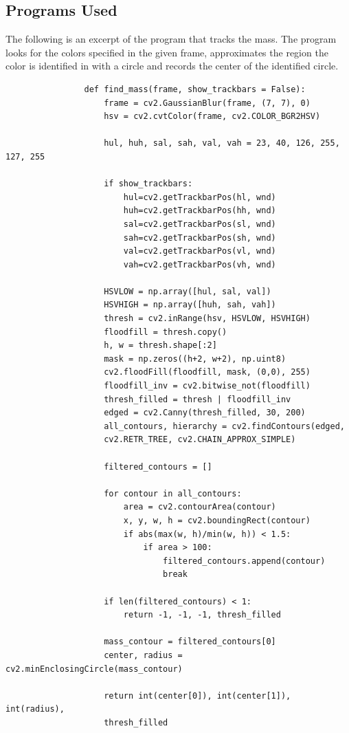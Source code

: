 \documentclass[11pt]{article}
\begin{document}
        \subsection{Programs Used}
            The following is an excerpt of the program that tracks the mass. The program looks for the colors specified in the given frame, approximates the region the color is identified in with a circle and records the center of the identified circle.
            \begin{verbatim}
                def find_mass(frame, show_trackbars = False):
                    frame = cv2.GaussianBlur(frame, (7, 7), 0)
                    hsv = cv2.cvtColor(frame, cv2.COLOR_BGR2HSV)

                    hul, huh, sal, sah, val, vah = 23, 40, 126, 255, 127, 255 

                    if show_trackbars:
                        hul=cv2.getTrackbarPos(hl, wnd)
                        huh=cv2.getTrackbarPos(hh, wnd)
                        sal=cv2.getTrackbarPos(sl, wnd)
                        sah=cv2.getTrackbarPos(sh, wnd)
                        val=cv2.getTrackbarPos(vl, wnd)
                        vah=cv2.getTrackbarPos(vh, wnd)

                    HSVLOW = np.array([hul, sal, val])
                    HSVHIGH = np.array([huh, sah, vah])
                    thresh = cv2.inRange(hsv, HSVLOW, HSVHIGH)
                    floodfill = thresh.copy()
                    h, w = thresh.shape[:2]
                    mask = np.zeros((h+2, w+2), np.uint8)
                    cv2.floodFill(floodfill, mask, (0,0), 255)
                    floodfill_inv = cv2.bitwise_not(floodfill)
                    thresh_filled = thresh | floodfill_inv    
                    edged = cv2.Canny(thresh_filled, 30, 200)
                    all_contours, hierarchy = cv2.findContours(edged, 
                    cv2.RETR_TREE, cv2.CHAIN_APPROX_SIMPLE)

                    filtered_contours = []

                    for contour in all_contours:
                        area = cv2.contourArea(contour)
                        x, y, w, h = cv2.boundingRect(contour)
                        if abs(max(w, h)/min(w, h)) < 1.5:
                            if area > 100:
                                filtered_contours.append(contour) 
                                break

                    if len(filtered_contours) < 1:
                        return -1, -1, -1, thresh_filled

                    mass_contour = filtered_contours[0]
                    center, radius = cv2.minEnclosingCircle(mass_contour)
                    
                    return int(center[0]), int(center[1]), int(radius), 
                    thresh_filled
    \end{verbatim}
\end{document}
